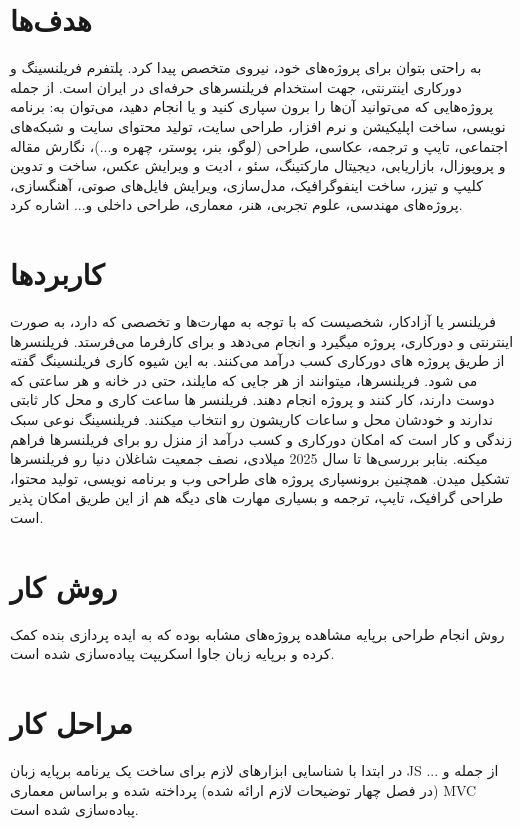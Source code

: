 \section{هدف‌ها}
به راحتی بتوان برای پروژه‌های خود، نیروی متخصص پیدا کرد.
 پلتفرم فریلنسینگ و دورکاری اینترنتی، جهت استخدام فریلنسرهای حرفه‌ای در ایران است. از جمله پروژه‌هایی که می‌توانید آن‌ها را برون سپاری کنید و یا انجام دهید، می‌توان به: برنامه نویسی، ساخت اپلیکیشن و نرم افزار، طراحی سایت، تولید محتوای سایت و شبکه‌های اجتماعی، تایپ و ترجمه، عکاسی، طراحی (لوگو، بنر، پوستر، چهره و...)، نگارش مقاله و پروپوزال، بازاریابی، دیجیتال مارکتینگ، 
 سئو
، ادیت و ویرایش عکس، ساخت و تدوین کلیپ و تیزر، ساخت اینفوگرافیک، مدل‌سازی، ویرایش فایل‌های صوتی، آهنگسازی، پروژه‌های مهندسی، علوم تجربی، هنر، معماری، طراحی داخلی و... اشاره کرد.

\section{کاربردها}
فریلنسر یا آزادکار، شخصیست که با توجه به مهارت‌ها و تخصصی که دارد، به صورت اینترنتی و دورکاری، پروژه میگیرد و انجام می‌دهد و برای کارفرما می‌فرستد. فریلنسرها از طریق پروژه های دورکاری کسب درآمد می‌کنند. به این شیوه کاری فریلنسینگ گفته می شود. فریلنسرها، میتوانند از هر جایی که مایلند، حتی در خانه و هر ساعتی که دوست دارند، کار کنند و پروژه انجام دهند. فریلنسر ها ساعت کاری و محل کار ثابتی ندارند و خودشان محل و ساعات کاریشون رو انتخاب میکنند. فریلنسینگ نوعی سبک زندگی و کار است که امکان دورکاری و کسب درآمد از منزل رو برای فریلنسرها فراهم میکنه. بنابر بررسی‌ها تا سال 2025 میلادی، نصف جمعیت شاغلان دنیا رو فریلنسرها تشکیل میدن. همچنین برونسپاری پروژه های طراحی وب و برنامه نویسی، تولید محتوا، طراحی گرافیک، تایپ، ترجمه و بسیاری مهارت های دیگه هم از این طریق امکان پذیر است.

\section{روش کار}
روش انجام طراحی برپایه مشاهده پروژه‌های مشابه بوده که به ایده پردازی بنده کمک کرده و برپایه زبان جاوا اسکریپت پیاده‌سازی شده است.

\section{مراحل کار}
در ابتدا با شناسایی ابزارهای لازم برای ساخت یک یرنامه برپایه زبان JS از جمله 
و ... (در فصل چهار توضیحات لازم ارائه شده) پرداخته شده و براساس معماری MVC پباده‌سازی شده است.

